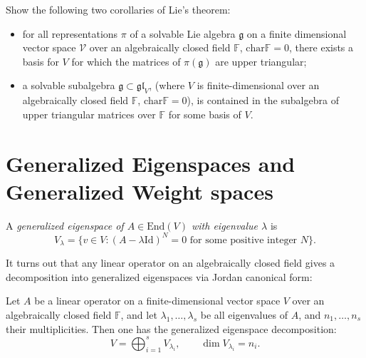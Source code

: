 \begin{exercise}
\label{exercise-corollaries-of-Lie-theorem}
Show the following two corollaries of Lie's theorem:
\begin{itemize}
\item for all representations $\pi$ of a solvable Lie algebra $\mathfrak{g}$ on
a finite dimensional vector space $\mathcal{V}$ over an algebraically closed
field $\mathbb{F}$, $\text{char}\mathbb{F}=0$, 
there exists a basis for $V$ for which the matrices
of $\pi(\mathfrak{g})$ are upper triangular;
\item a solvable subalgebra $\mathfrak{g} \subset \mathfrak{gl}_V$,
(where $V$ is finite-dimensional over an algebraically closed field
$\mathbb{F}$, $\text{char}\mathbb{F}=0$),
is contained in the subalgebra of upper triangular matrices
over $\mathbb{F}$ for some basis of $V$.
\end{itemize}
\end{exercise}

\section{Generalized Eigenspaces and Generalized Weight spaces}
\label{section-generalized-eigenspaces-and-generalized-weight-spaces}

\begin{definition}
\label{definition-generalized-eigenspace}
A {\it generalized eigenspace of $A \in \text{End}(V)$ 
with eigenvalue $\lambda$} is
$$
V_\lambda=\{v \in V:(A-\lambda \text{Id})^N=0
\text{ for some positive integer }N\}.
$$
\end{definition}

It turns out that any linear operator on an algebraically closed field gives a
decomposition into generalized eigenspaces via Jordan canonical form:

\begin{proposition}
\label{proposition-generalized-eigenspace-decomposition}
Let $A$ be a linear operator on a finite-dimensional
vector space $V$ over an algebraically closed
field $\mathbb{F}$, and let $\lambda_1,\ldots,\lambda_s$ 
be all eigenvalues of $A$, and $n_1,\ldots,n_s$ their 
multiplicities.
Then one has the generalized eigenspace decomposition:
$$
V=\bigoplus_{i=1}^s V_{\lambda_i},\qquad \dim V_{\lambda_i}=n_i.
$$
\end{proposition}

